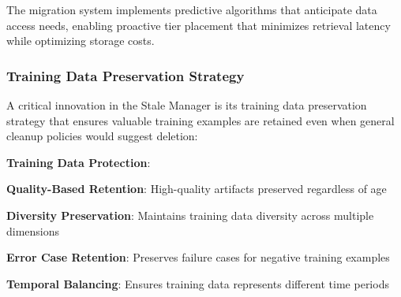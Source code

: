 The migration system implements predictive algorithms that anticipate data access needs, enabling proactive tier placement that minimizes retrieval latency while optimizing storage costs.

\subsubsection*{Training Data Preservation Strategy}

A critical innovation in the Stale Manager is its training data preservation strategy that ensures valuable training examples are retained even when general cleanup policies would suggest deletion:

\begin{alertbox}
\textbf{Training Data Protection}:
\begin{compactlist}
    \item \textbf{Quality-Based Retention}: High-quality artifacts preserved regardless of age
    \item \textbf{Diversity Preservation}: Maintains training data diversity across multiple dimensions
    \item \textbf{Error Case Retention}: Preserves failure cases for negative training examples
    \item \textbf{Temporal Balancing}: Ensures training data represents different time periods
\end{compactlist}
\end{alertbox}

